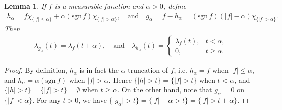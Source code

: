 \documentclass{article}
\numberwithin{equation}{section}
\theoremstyle{plain}
\newtheorem{lemma}[theorem]{Lemma}
\theoremstyle{definition}
\begin{document}
\begin{lemma}\label{mckwzlemma2}
	If $f$ is a measurable function and $\alpha>0$, define
	\begin{align*}
		h_\alpha=f\chi_{\{\vert f\vert\leq\alpha\}}+\alpha(\mathrm{sgn}\,f)\chi_{\{\vert f\vert>\alpha\}},\quad\text{and}\quad g_\alpha=f-h_\alpha=(\mathrm{sgn}\,f)(\vert f\vert-\alpha)\chi_{\{\vert f\vert>\alpha\}}.
	\end{align*}
	Then
	\begin{align*}
		\lambda_{g_\alpha}(t)=\lambda_f(t+\alpha),\quad\text{and}\quad\lambda_{h_\alpha}(t)=\begin{cases}
			\lambda_f(t), &t<\alpha,\\
			0, &t\geq\alpha.
		\end{cases}
	\end{align*}
\end{lemma}
\begin{proof}
	By definition, $h_\alpha$ is in fact the $\alpha$-truncation of $f$, i.e. $h_\alpha=f$ when $\vert f\vert\leq\alpha$, and $h_\alpha=\alpha(\mathrm{sgn}\,f)$ when $\vert f\vert>\alpha$. Hence $\{\vert h\vert>t\}=\{\vert f\vert>t\}$ when $t<\alpha$, and $\{\vert h\vert>t\}=\{\vert f\vert>t\}=\emptyset$ when $t\geq\alpha$. On the other hand, note that $g_\alpha=0$ on $\{\vert f\vert<\alpha\}$. For any $t>0$, we have $\{\vert g_\alpha\vert>t\}=\{\vert f\vert-\alpha>t\}=\{\vert f\vert>t+\alpha\}$.
\end{proof}
\end{document}
